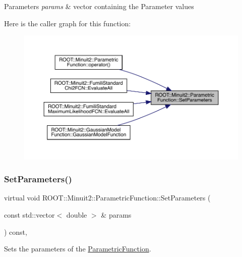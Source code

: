 \begin{DoxyParams}{Parameters}
{\em params} & vector containing the Parameter values \\
\hline
\end{DoxyParams}
Here is the caller graph for this function\+:
\nopagebreak
\begin{figure}[H]
\begin{center}
\leavevmode
\includegraphics[width=350pt]{d3/d76/classROOT_1_1Minuit2_1_1ParametricFunction_a63417244db376ec27f2c85ee6432f552_icgraph}
\end{center}
\end{figure}
\mbox{\label{classROOT_1_1Minuit2_1_1ParametricFunction_a63417244db376ec27f2c85ee6432f552}} 
\subsubsection{\texorpdfstring{SetParameters()}{SetParameters()}\hspace{0.1cm}{\footnotesize\ttfamily [2/3]}}
{\footnotesize\ttfamily virtual void R\+O\+O\+T\+::\+Minuit2\+::\+Parametric\+Function\+::\+Set\+Parameters (\begin{DoxyParamCaption}\item[{const std\+::vector$<$ double $>$ \&}]{params }\end{DoxyParamCaption}) const\hspace{0.3cm}{\ttfamily [inline]}, {\ttfamily [virtual]}}

Sets the parameters of the \mbox{\hyperlink{classROOT_1_1Minuit2_1_1ParametricFunction}{Parametric\+Function}}.


